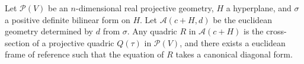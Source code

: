 Let $\mathcal{P}(V)$ be an $n$-dimensional real projective geometry, $H$ a hyperplane, and $\sigma$ a positive definite bilinear form on $H$. Let $\mathcal{A}(c+H, d)$ be the euclidean geometry determined by $d$ from $\sigma$. Any quadric $R$ in $\mathcal{A}(c+H)$ is the cross-section of a projective quadric $Q(\tau)$ in $\mathcal{P}(V)$, and there exists a euclidean frame of reference such that the equation of $R$ takes a canonical diagonal form.
